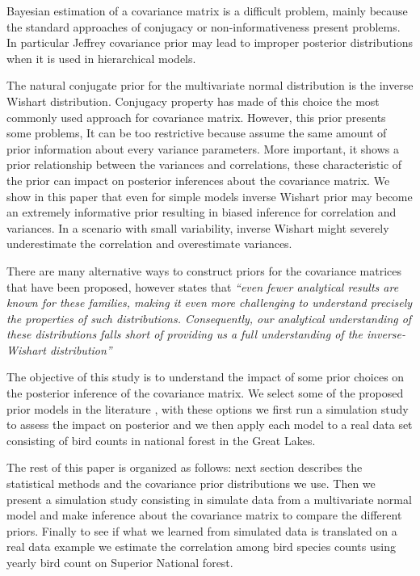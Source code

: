 \documentclass{article}
\begin{document}
Bayesian estimation of a covariance matrix is a difficult problem, mainly because the standard approaches of conjugacy or non-informativeness present problems. In particular Jeffrey covariance prior may lead to improper posterior distributions when it is used in hierarchical models.  

The natural conjugate prior for the multivariate normal distribution is the inverse Wishart distribution. Conjugacy property has made of this choice the most commonly used approach for covariance matrix. However, this prior presents some problems, It can be too restrictive because assume the same amount of prior information about every variance parameters. More important, it shows a prior relationship between the variances and correlations, these characteristic of the prior can impact on posterior inferences about the covariance matrix. We show in this paper that even for simple models inverse Wishart prior may become an extremely informative prior resulting in biased inference for correlation and variances. In a scenario with small variability, inverse Wishart might severely underestimate the correlation and overestimate variances. 

There are many alternative ways to construct priors for the covariance matrices that have been proposed,  however \cite{visualize} states that 
 \textit{``even fewer analytical results are known for these families, making it even more challenging to understand precisely the properties of such distributions. Consequently, our analytical understanding of these distributions falls short of providing us a full understanding of the inverse-Wishart distribution'' }
 
The objective of this study is to understand the impact of some prior choices on the posterior inference of the covariance matrix. We select some of the proposed prior models in the literature , with these options we first run a simulation study to assess the impact on posterior and we then apply each model  to a real data set consisting of bird counts in national forest in the Great Lakes. 

The rest of this paper is organized as follows: next section describes the statistical methods and the covariance prior distributions we use. Then we present a simulation study consisting in simulate data from a multivariate normal model and make inference about the covariance matrix to compare the different priors. Finally to see if what we learned from simulated data is translated on a real data example we estimate the correlation among bird species counts using yearly bird count on Superior National forest. 
\end{document}
